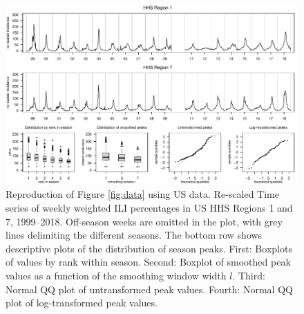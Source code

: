 \documentclass[12pt]{article}
\begin{document}
\begin{figure}[h]
\center
\includegraphics[width=1\textwidth]{figure/plot_data_us.pdf}
\caption{Reproduction of Figure \ref{fig:data} using US data. Re-scaled Time series of weekly weighted ILI percentages in US HHS Regions 1 and 7, 1999--2018. Off-season weeks are omitted in the plot, with grey lines delimiting the different seasons. The bottom row shows descriptive plots of the distribution of season peaks. First: Boxplots of values by rank within season. Second: Boxplot of smoothed peak values as a function of the smoothing window width $l$. Third: Normal QQ plot of untransformed peak values. Fourth: Normal QQ plot of log-transformed peak values.}
\label{fig:data_us}
\end{figure}

\newpage
\end{document}
